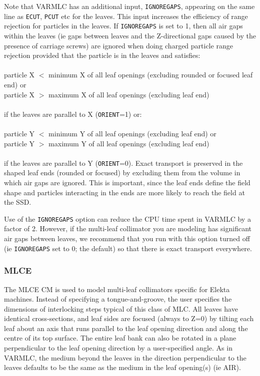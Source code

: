 \documentclass[12pt,twoside]{article}
\begin{document}
Note that VARMLC has an additional input, {\tt IGNOREGAPS}, appearing on
the same line as {\tt ECUT}, {\tt PCUT} etc for the leaves.  This input
increases the efficiency of range rejection for particles in the
leaves.  If {\tt IGNOREGAPS} is set to 1, then all air gaps within the leaves
(ie gaps between leaves and the Z-directional gaps caused by the presence
of carriage screws) are ignored when doing charged particle range rejection
provided that the particle is in the leaves and satisfies:\\
~~~\\
particle X $<$ minimum X of all leaf openings (excluding rounded or focused leaf end) or\\
particle X $>$ maximum X of all leaf openings (excluding leaf end)\\
~~\\
if the leaves are parallel to X ({\tt ORIENT}=1) or:\\
~~~\\
particle Y $<$ minimum Y of all leaf openings (excluding leaf end) or\\
particle Y $>$ maximum Y of all leaf openings (excluding leaf end)\\
~~\\
if the leaves are parallel to Y ({\tt ORIENT}=0).  Exact transport is
preserved in the shaped leaf ends (rounded or focused) by excluding them
from the volume in which air gaps are ignored.  This is important, since
the leaf ends define the field shape and particles interacting in the ends are
more likely to reach the field at the SSD.

Use of the {\tt IGNOREGAPS} option can reduce the CPU time spent in
VARMLC by a factor of 2.  However, if the multi-leaf collimator you
are modeling has significant air gaps between leaves, we recommend
that you run with this option turned off
(ie {\tt IGNOREGAPS} set to 0; the default) so that there is exact
transport everywhere.


\clearpage


\subsubsection{MLCE}
\label{mlce}
\renewcommand{\rightmark}{MLCE CM}
The MLCE CM is used to model multi-leaf collimators specific for
Elekta machines.  Instead of
specifying a tongue-and-groove, the user specifies the dimensions of
interlocking steps typical of this class of MLC.  All leaves
have identical cross-sections, and leaf sides
are focused (always to Z=0) by tilting each leaf about an
axis that runs parallel to the leaf opening direction
and along the centre of its top surface.  The entire leaf bank can also
be rotated in a plane
perpendicular to the leaf opening direction by a user-specified angle.
As in
VARMLC, the medium beyond the leaves in the direction perpendicular
to the leaves defaults to be the same as the medium in the leaf opening(s)
(ie AIR).
\end{document}
